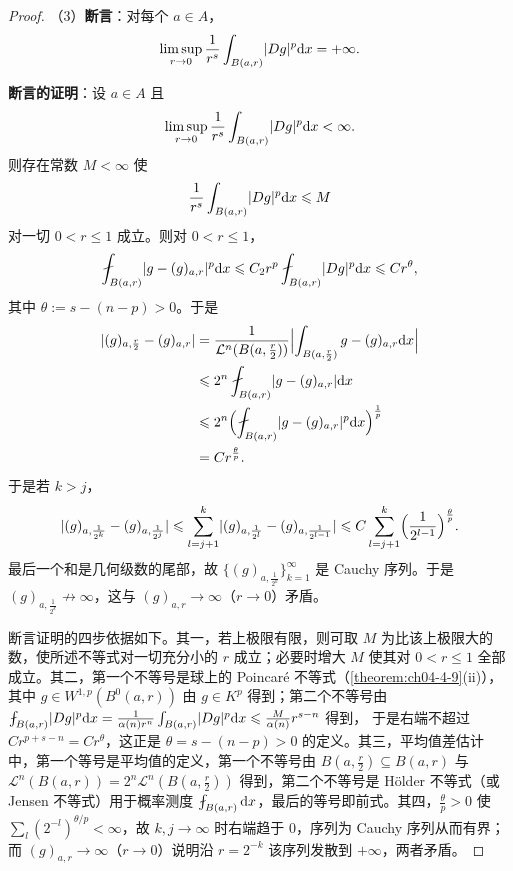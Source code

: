 \documentclass[../../main.tex]{subfiles}%
\begin{document}
\begin{proof}
（3）\textbf{断言}：对每个 $a\in A$，
\begin{align*}
\limsup_{r\to0}\frac{1}{r^s}\int_{B(a,r)}\lvert Dg\rvert^p\mathrm{d} x=+\infty .
\end{align*}

\textbf{断言的证明}：设 $a\in A$ 且
\begin{align*}
\limsup_{r\to0}\frac{1}{r^s}\int_{B(a,r)}\lvert Dg\rvert^p\mathrm{d} x<\infty .
\end{align*}
则存在常数 $M<\infty$ 使
\begin{align*}
\frac{1}{r^s}\int_{B(a,r)}\lvert Dg\rvert^p\mathrm{d} x\leqslant M
\end{align*}
对一切 $0<r\leqslant1$ 成立。则对 $0<r\leqslant1$，
\begin{align*}
\fint_{B(a,r)}\lvert g-(g)_{a,r}\rvert^p\diff x\leqslant C_2r^p\fint_{B(a,r)}\lvert Dg\rvert^p\diff x\leqslant Cr^\theta ,
\end{align*}
其中 $\theta:=s-(n-p)>0$。于是
\begin{align*}
\lvert(g)_{a,\frac r2}-(g)_{a,r}\rvert&=\frac{1}{\mathcal{L}^n(B(a,\frac r2))}\Bigl\lvert\int_{B(a,\frac r2)}g-(g)_{a,r}\diff x\Bigr\rvert\\
&\leqslant2^n\fint_{B(a,r)}\lvert g-(g)_{a,r}\rvert\diff x\\
&\leqslant2^n\Bigl(\fint_{B(a,r)}\lvert g-(g)_{a,r}\rvert^p\diff x\Bigr)^{\frac1p}\\
&=Cr^{\frac\theta p} .
\end{align*}
于是若 $k>j$，
\begin{align*}
\lvert(g)_{a,\frac1{2^k}}-(g)_{a,\frac1{2^j}}\rvert\leqslant\sum_{l=j+1}^k\lvert(g)_{a,\frac1{2^l}}-(g)_{a,\frac1{2^{l-1}}}\rvert\leqslant C\sum_{l=j+1}^k\Bigl(\frac{1}{2^{l-1}}\Bigr)^{\frac\theta p}.
\end{align*}
最后一个和是几何级数的尾部，故 $\{(g)_{a,\frac1{2^k}}\}_{k=1}^{\infty}$ 是 Cauchy 序列。于是 $(g)_{a,\frac1{2^k}}\not\to\infty$，这与 $(g)_{a,r}\to\infty$（$r\to0$）矛盾。

断言证明的四步依据如下。其一，若上极限有限，则可取 $M$ 为比该上极限大的数，使所述不等式对一切充分小的 $r$ 成立；必要时增大 $M$ 使其对 $0<r\leqslant1$ 全部成立。其二，第一个不等号是球上的 Poincaré 不等式（\cref{theorem:ch04-4-9}(ii)），其中 $g\in W^{1,p}(B^{0}(a,r))$ 由 $g\in K^p$ 得到；第二个不等号由 $\fint_{B(a,r)}\lvert Dg\rvert^p\diff x=\frac{1}{\alpha(n)r^n}\int_{B(a,r)}\lvert Dg\rvert^p\diff x\leqslant\frac{M}{\alpha(n)}r^{s-n}$ 得到，%
于是右端不超过 $Cr^{p+s-n}=Cr^{\theta}$，这正是 $\theta=s-(n-p)>0$ 的定义。其三，平均值差估计中，第一个等号是平均值的定义，第一个不等号由 $B(a,\frac r2)\subseteq B(a,r)$ 与 $\mathcal{L}^n(B(a,r))=2^n\mathcal{L}^n(B(a,\frac r2))$ 得到，第二个不等号是 Hölder 不等式（或 Jensen 不等式）用于概率测度 $\fint_{B(a,r)}\diff x$，最后的等号即前式。其四，$\frac\theta p>0$ 使 $\sum_l(2^{-l})^{\theta/p}<\infty$，故 $k,j\to\infty$ 时右端趋于 $0$，序列为 Cauchy 序列从而有界；而 $(g)_{a,r}\to\infty$（$r\to0$）说明沿 $r=2^{-k}$ 该序列发散到 $+\infty$，两者矛盾。


\end{proof}
\end{document}
